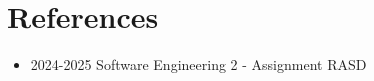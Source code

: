 \section{References}
\begin{itemize}
    \item 2024-2025 Software Engineering 2 - Assignment RASD
\end{itemize}
